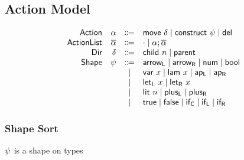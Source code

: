 \documentclass{article}
\begin{document}
\subsection{Action Model}
\[\begin{array}{rrcl}
  \AMName  & \AMV  & \Coloneqq & \AMove{\MMV} \mid \ACon{\SMV} \mid \ADel \\
  \AIMName & \AIMV & \Coloneqq & \AINil \mid \AICons{\AMV}{\AIMV} \\
  \MMName  & \MMV  & \Coloneqq & \MChild{\MChildNMV} \mid \MParent \\
  \SMName  & \SMV  & \Coloneqq & \STArrowL \mid \STArrowR \mid \STNum \mid \STBool \\
           &       & \mid         & \SVar{x} \mid \SLam{x} \mid \SApL \mid \SApR \\
           &       & \mid         & \SLetL{x} \mid \SLetR{x} \\
           &       & \mid         & \SLit{n} \mid \SPlusL \mid \SPlusR \\
           &       & \mid         & \STrue \mid \SFalse \mid \SIfC \mid \SIfL \mid \SIfR \\
\end{array}\]

\subsubsection{Shape Sort}
\judgbox{\ensuremath{\tshape{\SMV}}} $\SMV$ is a shape on types
%
\begin{mathpar}



\end{mathpar}
\end{document}
